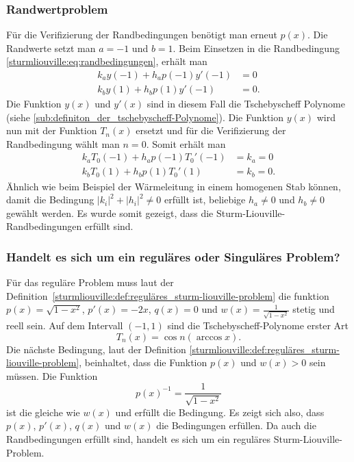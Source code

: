 \subsubsection*{Randwertproblem}
Für die Verifizierung der Randbedingungen benötigt man erneut $p(x)$.
Die Randwerte setzt man $a = -1$ und $b = 1$.
Beim Einsetzen in die Randbedingung \eqref{sturmliouville:eq:randbedingungen},
erhält man
\begin{equation}
	\begin{aligned}
		k_a y(-1) + h_a p(-1) y'(-1) &= 0\\
		k_b y(1) + h_b p(1) y'(-1) &= 0.
	\end{aligned} 
\end{equation}
Die Funktion $y(x)$ und $y'(x)$ sind in diesem Fall die Tschebyscheff Polynome
(siehe \ref{sub:definiton_der_tschebyscheff-Polynome}).
Die Funktion $y(x)$ wird nun mit der Funktion $T_n(x)$ ersetzt und für die
Verifizierung der Randbedingung wählt man $n=0$.
Somit erhält man
\begin{equation}
	\begin{aligned}
		k_a T_0(-1) + h_a p(-1) T_{0}'(-1) &= k_a = 0\\
		k_b T_0(1) + h_b p(1) T_{0}'(1) &= k_b = 0.
	\end{aligned}
\end{equation}
Ähnlich wie beim Beispiel der Wärmeleitung in einem homogenen Stab können,
damit die Bedingung $|k_i|^2 + |h_i|^2\ne 0$ erfüllt ist, beliebige
$h_a \ne 0$ und $h_b \ne 0$ gewählt werden.
Es wurde somit gezeigt, dass die Sturm-Liouville-Randbedingungen erfüllt sind.

\subsubsection*{Handelt es sich um ein reguläres oder Singuläres Problem?}
Für das reguläre Problem muss laut der
Definition~\ref{sturmliouville:def:reguläres_sturm-liouville-problem} die funktion
$p(x) = \sqrt{1-x^2}$, $p'(x) = -2x$, $q(x) = 0$ und
$w(x) = \frac{1}{\sqrt{1-x^2}}$ stetig und reell sein.
Auf dem Intervall $(-1,1)$ sind die Tschebyscheff-Polynome erster Art
\begin{equation}
	T_n(x)
	=
	\cos n (\arccos x).
\end{equation}
Die nächste Bedingung, laut der Definition \ref{sturmliouville:def:reguläres_sturm-liouville-problem}, beinhaltet, dass die Funktion $p(x)$ und $w(x)>0$ sein
müssen.
Die Funktion
\begin{equation*}
	p(x)^{-1} = \frac{1}{\sqrt{1-x^2}}
\end{equation*}
ist die gleiche wie $w(x)$ und erfüllt die Bedingung.
Es zeigt sich also, dass $p(x)$, $p'(x)$, $q(x)$ und $w(x)$
die Bedingungen erfüllen.
Da auch die Randbedingungen erfüllt sind, handelt es sich um ein reguläres Sturm-Liouville-Problem.


